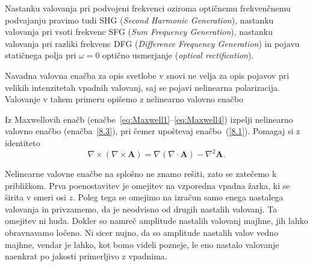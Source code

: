 \begin{remark}
Nastanku valovanja pri podvojeni frekvenci oziroma optičnemu frekvenčnemu podvajanju pravimo tudi
SHG ({\it Second Harmonic 
Generation}), 
nastanku valovanja pri vsoti frekvenc SFG
({\it Sum Frequency Generation}), 
nastanku valovanja pri razliki frekvenc DFG 
({\it Difference Frequency Generation}) in pojavu 
statičnega polja pri $\omega = 0$ optično usmerjanje
({\it optical rectification}).  
\end{remark}

Navadna valovna enačba za opis svetlobe v snovi  
ne velja za opis pojavov pri velikih 
intenzitetah vpadnih valovanj, saj se pojavi nelinearna polarizacija. Valovanje 
v takem primeru opišemo z nelinearno valovno 
enačbo

\begin{definition}
Iz Maxwellovih enačb (enačbe~\ref{eq:Maxwell1}--\ref{eq:Maxwell4}) izpelji 
nelinearno valovno enačbo (enačba~\ref{8.3}), pri čemer upoštevaj enačbo~(\ref{8.1}). 
Pomagaj si z identiteto
\begin{equation}
\nabla \times (\nabla \times \mathbf{A}) = \nabla (\nabla \cdot \mathbf{A}) 
- \nabla^2 \mathbf{A}.
\end{equation}
\end{definition} 

Nelinearne valovne enačbe na splošno ne znamo rešiti, zato se zatečemo k približkom.
Prva poenostavitev je omejitev na vzporedna vpadna žarka,
ki se širita v smeri osi $z$. Poleg tega se omejimo na izračun samo enega
nastalega valovanja in privzamemo, da je neodvisno od drugih nastalih valovanj.
Ta omejitev ni huda. Dokler so namreč amplitude nastalih valovanj majhne, 
jih lahko obravnavamo ločeno. Ni sicer nujno,
da so amplitude nastalih valov vedno majhne, vendar je lahko, kot bomo videli 
pozneje, le eno nastalo valovanje naenkrat po jakosti primerljivo z vpadnima. 

